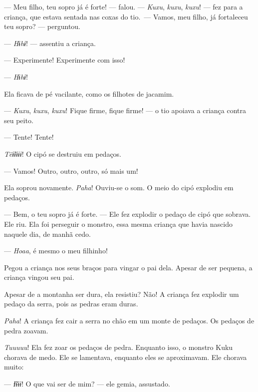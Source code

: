 --- Meu filho, teu sopro já é forte! --- falou. --- \textit{Kuxu}, \textit{kuxu},
\textit{kuxu}! --- fez para a criança, que estava sentada nas coxas do
tio.~--- Vamos, meu filho, já fortaleceu teu sopro? --- perguntou.

--- \textit{Hɨhɨ}! --- assentiu a criança. 

--- Experimente! Experimente com isso! 

--- \textit{Hɨhɨ}! 

Ela ficava de pé vacilante, como os filhotes de jacamim. 

--- \textit{Kuxu}, \textit{kuxu}, \textit{kuxu}! Fique firme, fique firme! --- o tio apoiava a
criança contra seu peito. 

--- Tente! Tente! 

   

\textit{Tëɨ̃ɨɨɨɨ}! O cipó se destruiu em pedaços. 

--- Vamos! Outro, outro, outro, só mais um!

Ela soprou novamente. \textit{Paha}! Ouviu-se o som. O meio do cipó explodiu em pedaços. 

--- Bem, o teu sopro já é forte. --- Ele fez explodir o pedaço de cipó
que sobrava. Ele riu. Ela foi perseguir o monstro, essa mesma criança
que havia nascido naquele dia, de manhã cedo. 

--- \textit{Hoaa}, é mesmo o meu filhinho! 

Pegou a criança nos seus braços para vingar o pai dela. Apesar de ser
pequena, a criança vingou seu pai. 

Apesar de a montanha ser dura, ela resistiu? Não! A criança fez explodir um
pedaço da serra, pois as pedras eram duras. 

\textit{Paha}! A criança fez cair a serra no chão em um monte de pedaços. Os
pedaços de pedra zoavam.

\textit{Tuuuuu}! Ela fez zoar os pedaços de pedra. Enquanto isso, o monstro Kuku
chorava de medo. Ele se lamentava, enquanto eles se aproximavam. Ele
chorava muito:

--- \textit{Ɨ̃ɨɨɨ}! O que vai ser de mim? --- ele gemia, assustado. 

